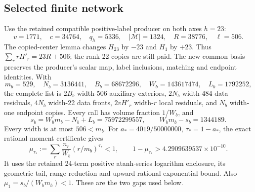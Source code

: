 \subsection{Selected finite network}
Use the retained compatible positive-label producer on both axes $h=23$:
\[
 v=1771,\quad c=34764,\quad q_h=5336,\quad
 |\mathcal M|=1324,\quad R=38776,\quad\ell=506.
\]
The copied-center lemma changes $H_{23}$ by $-23$ and $H_1$ by $+23$.
Thus $\sum_r rH'_r=23R+506$; the rank-22 copies are still paid.
The new common basis preserves the producer's scalar map, label
inclusions, matching and endpoint identities. With
\[
 m_b=529,\quad N_b=3136441,\quad B_b=68672296,\quad
 W_b=143617474,\quad L_b=1792252,
\]
the complete list is $2B_b$ width-506 auxiliary exteriors,
$2N_b$ width-484 data residuals, $4N_b$ width-22 data fronts,
$2vH'_r$ width-$r$ local residuals, and $N_b$ width-one endpoint copies.
Every call has volume fraction $1/W_b$, and
\[
 s_b=W_bm_b-N_b+L_b=75972299557,\qquad W_bm_b-s_b=1344189.
\]
Every width is at most $506<m_b$. For $a_*=4019/50000000$,
$\tau_*=1-a_*$, the exact rational moment certificate gives
\[
 \mu_{\tau_*}:=\sum_r\frac{n_r}{W_b}(r/m_b)^{\tau_*}<1,
 \qquad 1-\mu_{\tau_*}>4.2909639537\times10^{-10}.
\]
It uses the retained 24-term positive atanh-series logarithm enclosure,
its geometric tail, range reduction and upward rational exponential
bound. Also $\mu_1=s_b/(W_bm_b)<1$. These are the two gaps used below.
